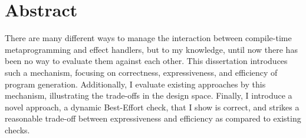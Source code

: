 \chapter*{Abstract}
There are many different ways to manage the interaction between compile-time metaprogramming and effect handlers, but to my knowledge, until now there has been no way to evaluate them against each other. This dissertation introduces such a mechanism, focusing on correctness, expressiveness, and efficiency of program generation. Additionally, I evaluate existing approaches by this mechanism, illustrating the trade-offs in the design space. Finally, I introduce a novel approach, a dynamic Best-Effort check, that I show is correct, and strikes a reasonable trade-off between expressiveness and efficiency as compared to existing checks. 